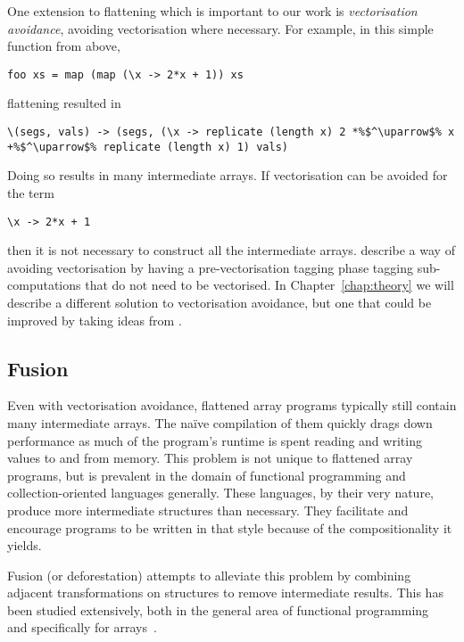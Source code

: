 One extension to flattening which is important to our work is \emph{vectorisation avoidance}, avoiding vectorisation where necessary. For example, in this simple function from above,
%
\begin{lstlisting}
foo xs = map (map (\x -> 2*x + 1)) xs
\end{lstlisting}
%
flattening resulted in
%
%
\begin{lstlisting}
\(segs, vals) -> (segs, (\x -> replicate (length x) 2 *%$^\uparrow$% x +%$^\uparrow$% replicate (length x) 1) vals)
\end{lstlisting}
%
Doing so results in many intermediate arrays. If vectorisation can be avoided for the term
%
\begin{lstlisting}
\x -> 2*x + 1
\end{lstlisting}
%
then it is not necessary to construct all the intermediate arrays. \citet{Keller:avoidance} describe a way of avoiding vectorisation by having a pre-vectorisation tagging phase tagging sub-computations that do not need to be vectorised. In Chapter~\ref{chap:theory} we will describe a different solution to vectorisation avoidance, but one that could be improved by taking ideas from \citet{Keller:avoidance}.

\subsection{Fusion}
\label{sec:fusion}

Even with vectorisation avoidance, flattened array programs typically still contain many intermediate arrays. The na\"ive compilation of them quickly drags down performance as much of the program's runtime is spent reading and writing values to and from memory. This problem is not unique to flattened array programs, but is prevalent in the domain of functional programming and  collection-oriented languages generally. These languages, by their very nature, produce more intermediate structures than necessary. They facilitate and encourage programs to be written in that style because of the compositionality it yields.

Fusion (or deforestation) attempts to alleviate this problem by combining adjacent transformations on structures to remove intermediate results. This has been studied extensively, both in the general area of functional programming~\cite{Wadler:1990ix,Meijer:bananas,Gill:1993de,Coutts:stream-fusion} and specifically for arrays~\cite{Chakravarty:array-fusion,Lippmeier:Guiding,McDonell:acc-optim,Lippmeier:flow-fusion}.

